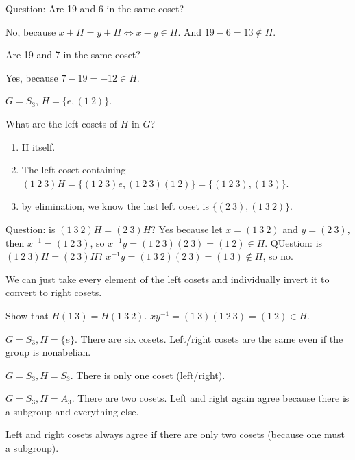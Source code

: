 \documentclass[class=article,crop=false]{standalone}
\begin{document}
\begin{eg}[]

Question: Are 19 and 6 in the same coset?

No, because $ x+H=y+H \iff x-y \in H$. And $19-6=13 \not\in H$. 

Are 19 and 7 in the same coset?

Yes, because $ 7-19=-12 \in H$.

\end{eg}

\begin{eg}
	$ G=S_3$,  $ H=\{e, (1\ 2)\} $. 

	What are the left cosets of $ H$ in  $ G$?
	 \begin{enumerate}[label=\arabic*)]
		\item H itself.
		\item The left coset containing $ (1\ 2\ 3)H = \{(1\ 2\ 3)e, (1\ 2\ 3)(1\ 2)\} =\{(1\ 2\ 3), (1\ 3)\}  $.
		\item by elimination, we know the last left coset is $ \{(2\ 3),(1\ 3\ 2)\} $.
	
	\end{enumerate}
			Question: is $ (1\ 3\ 2)H=(2\ 3)H$? Yes because let  $ x= (1\ 3\ 2)$ and  $ y=(2\ 3)$, then  $ x^{-1}= (1\ 2\ 3)$, so $ x^{-1}y=(1\ 2\ 3)(2\ 3)=(1\ 2) \in H$.
			QUestion: is $ (1\ 2\ 3)H=(2\ 3)H$?  $ x^{-1}y=(1\ 3\ 2)(2\ 3) = (1\ 3) \not\in H$, so no.

We can just take every element of the left cosets and individually invert it to convert to right cosets. 

Show that $ H(1\ 3)=H(1\ 3\ 2)$.  $ xy^{-1}=(1\ 3)(1\ 2\ 3)=(1\ 2) \in H$.

\end{eg}
\begin{eg}[]
	$ G=S_3, H=\{e\}  $. There are six cosets. Left/right cosets are the same even if the group is nonabelian.
\end{eg}

\begin{eg}[]
	$ G=S_3,H=S_3$. There is only one coset (left/right).
\end{eg}
\begin{eg}[]
	$ G=S_3, H=A_3$. There are two cosets. Left and right again agree because there is a subgroup and everything else.
\end{eg}
\begin{claim}[]
	Left and right cosets always agree if there are only two cosets (because one must a subgroup).
\end{claim}
\end{document}
